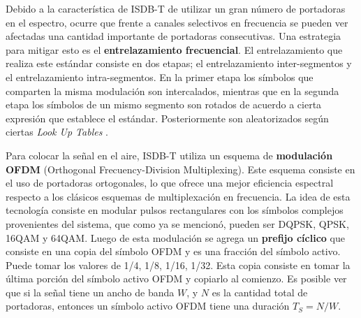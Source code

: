 \documentclass[journal,comsoc]{IEEEtran}
\begin{document}
Debido a la característica de ISDB-T de utilizar un gran número de portadoras en el espectro, ocurre que frente a canales selectivos en frecuencia se pueden ver afectadas una cantidad importante de portadoras consecutivas. Una estrategia para mitigar esto es el \textbf{entrelazamiento frecuencial}. El entrelazamiento que realiza este estándar consiste en dos etapas; el entrelazamiento inter-segmentos y el entrelazamiento intra-segmentos. En la primer etapa los símbolos que comparten la misma modulación son intercalados, mientras que en la segunda etapa los símbolos de un mismo segmento son rotados de acuerdo a cierta expresión que establece el estándar. Posteriormente son aleatorizados según ciertas \textit{Look Up Tables} \cite{norma}.

Para colocar la señal en el aire, ISDB-T utiliza un esquema de \textbf{modulación OFDM} \cite{chang-ofdm} (Orthogonal Frecuency-Division Multiplexing). Este esquema consiste en el uso de portadoras ortogonales, lo que ofrece una mejor eficiencia espectral respecto a los clásicos esquemas de multiplexación en frecuencia.
La idea de esta tecnología consiste en modular pulsos rectangulares con los símbolos complejos provenientes del sistema, que como ya se mencionó, pueden ser DQPSK, QPSK, 16QAM y 64QAM. Luego de esta modulación se agrega un \textbf{prefijo cíclico} que consiste en una copia del símbolo OFDM y es una fracción del símbolo activo. Puede tomar los valores de 1/4, 1/8, 1/16, 1/32. Esta copia consiste en tomar la última porción del símbolo activo OFDM y copiarlo al comienzo.  Es posible ver que si la señal tiene un ancho de banda $W$, y $N$ es la cantidad total de portadoras, entonces un símbolo activo OFDM tiene una duración $T_S = N/W$\cite{chang-ofdm}.
\end{document}
